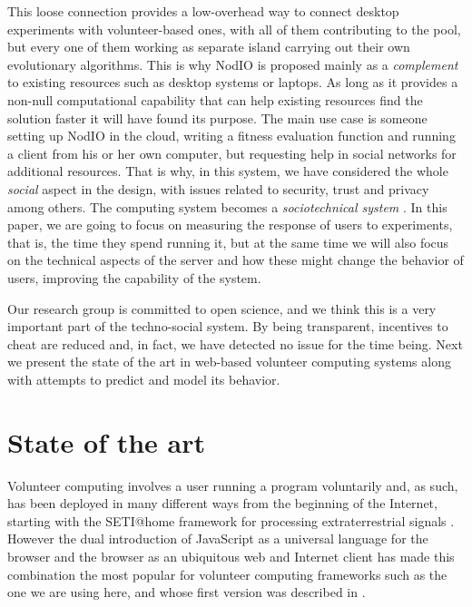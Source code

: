 \documentclass[letterpaper]{article}
\begin{document}
This loose connection provides a low-overhead way to connect desktop
experiments with volunteer-based ones, with all of them contributing
to the pool, but every one of them working as separate island carrying
out their own evolutionary algorithms. This is why NodIO is proposed
mainly as a {\em complement} to existing resources such as desktop
systems or laptops. As long as it provides a non-null computational
capability that can help existing resources find the solution faster
it will have found its purpose. The main use case is someone setting
up NodIO in the cloud, writing a fitness evaluation function and
running a client from his or her own computer, but requesting help in
social networks for additional resources. That is why, in this system,
we have considered the whole {\em social} aspect in the design, with
issues related to security, trust and privacy among others. The
computing system becomes a {\em sociotechnical system}
\citep{vespignani2009predicting}. In this paper, we are going to focus
on measuring the response of users to experiments, that is, the time
they spend running it, but at the same time we will also focus on the
technical aspects of the server and how these might change the
behavior of users, improving the capability of the system.

Our research group is committed to open science, and we think this is
a very important part of the techno-social system. By being
transparent, incentives to cheat are reduced and, in fact, we have
detected no issue for the time being. Next we present the state of the
art in web-based volunteer computing systems along with attempts to
predict and model its behavior. 


\section{State of the art}
\label{sec:soa}

Volunteer computing involves a user running a program voluntarily
and, as such, has been deployed in many different ways from the
beginning of the Internet, starting with the SETI@home framework for
processing extraterrestrial signals \citep{david-seti:home}. However
the dual introduction of JavaScript as a universal language for the
browser and the browser as an ubiquitous web and Internet client has
made this combination the most popular for volunteer computing
frameworks such as the one we are using here, and whose first version
was described in \citep{DBLP:conf/gecco/GuervosG15}.
\end{document}
